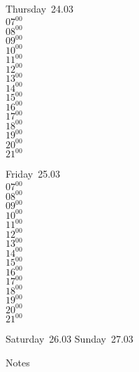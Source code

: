 \documentclass[11pt,a4paper]{book}\usepackage[]{graphicx}\usepackage[]{color}
\begin{document}
\clearpage
\begin{headerbox}
\end{headerbox}
\begin{weekdaybox}
  Thursday~24.03\\
  { 
  \vfill
  $07^{00}$\\
$08^{00}$\\
$09^{00}$\\
$10^{00}$\\
$11^{00}$\\
$12^{00}$\\
$13^{00}$\\
$14^{00}$\\
$15^{00}$\\
$16^{00}$\\
$17^{00}$\\
$18^{00}$\\
$19^{00}$\\
$20^{00}$\\
$21^{00}$\\
  }
\end{weekdaybox} 
\begin{weekdaybox}
  Friday~25.03\\
  { 
  \vfill
  $07^{00}$\\
$08^{00}$\\
$09^{00}$\\
$10^{00}$\\
$11^{00}$\\
$12^{00}$\\
$13^{00}$\\
$14^{00}$\\
$15^{00}$\\
$16^{00}$\\
$17^{00}$\\
$18^{00}$\\
$19^{00}$\\
$20^{00}$\\
$21^{00}$\\
  }
\end{weekdaybox}
\begin{weekendbox}
  Saturday~26.03
  \tcblower
  Sunday~27.03
\end{weekendbox} %
\begin{notebox}
  Notes
\end{notebox}
\clearpage
\end{document}
